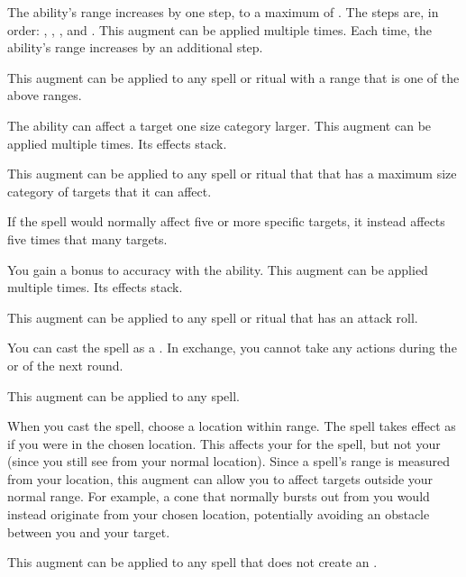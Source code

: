              The ability's range increases by one step, to a maximum of \rngext.
            The steps are, in order: \rngclose, \rngmed, \rnglong, and \rngext.
            This augment can be applied multiple times.
            Each time, the ability's range increases by an additional step.
            \par This augment can be applied to any spell or ritual with a range that is one of the above ranges.

             The ability can affect a target one size category larger.
            This augment can be applied multiple times.
            Its effects stack.
            \par This augment can be applied to any spell or ritual that that has a maximum size category of targets that it can affect.

             If the spell would normally affect five or more specific targets, it instead affects five times that many targets.

             You gain a  bonus to accuracy with the ability.
            This augment can be applied multiple times.
            Its effects stack.
            \par This augment can be applied to any spell or ritual that has an attack roll.

             You can cast the spell as a .
            In exchange, you cannot take any actions during the  or  of the next round.
            \par This augment can be applied to any spell.

             When you cast the spell, choose a location within \rngclose range.
            The spell takes effect as if you were in the chosen location.
            This affects your  for the spell, but not your  (since you still see from your normal location).
            Since a spell's range is measured from your location, this augment can allow you to affect targets outside your normal range.
            For example, a cone that normally bursts out from you would instead originate from your chosen location, potentially avoiding an obstacle between you and your target.
            \par This augment can be applied to any spell that does not create an .

